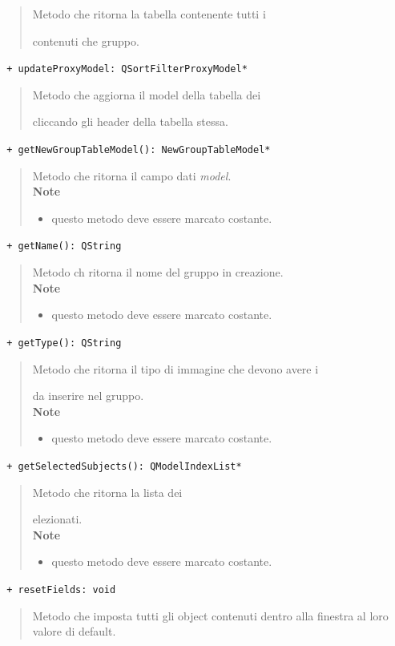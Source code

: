 \begin{quote}Metodo che ritorna la tabella contenente tutti i \subject{} contenuti che gruppo.
\end{quote}
\color{blue}\verb! + updateProxyModel: QSortFilterProxyModel*!
\color{black} 
\begin{quote}Metodo che aggiorna il model della tabella dei \subject{} cliccando gli header della tabella stessa.
\end{quote}
\color{blue}\verb! + getNewGroupTableModel(): NewGroupTableModel*!
\color{black} 
\begin{quote}Metodo che ritorna il campo dati \emph{model}. \\
\textbf{Note}
 \begin{itemize}
 \item questo metodo deve essere marcato costante.
 \end{itemize}
\end{quote}
\color{blue}\verb! + getName(): QString!
\color{black} 
\begin{quote}Metodo ch ritorna il nome del gruppo in creazione. \\
\textbf{Note}
 \begin{itemize}
 \item questo metodo deve essere marcato costante.
 \end{itemize}
\end{quote}
\color{blue}\verb! + getType(): QString!
\color{black} 
\begin{quote}Metodo che ritorna il tipo di immagine che devono avere i \subject{} da inserire nel gruppo. \\
\textbf{Note}
 \begin{itemize}
 \item questo metodo deve essere marcato costante.
 \end{itemize}
\end{quote}
\color{blue}\verb! + getSelectedSubjects(): QModelIndexList*!
\color{black} 
\begin{quote}Metodo che ritorna la lista dei \subject selezionati. \\
\textbf{Note}
 \begin{itemize}
 \item questo metodo deve essere marcato costante.
 \end{itemize}
\end{quote}
\color{blue}\verb! + resetFields: void !
\color{black} 
\begin{quote}Metodo che imposta tutti gli object contenuti dentro alla finestra al loro valore di default. \\
\end{quote}
